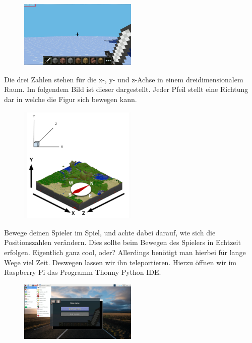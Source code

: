 \begin{figure}[H]
	\includegraphics[width=0.5\textwidth]{Bilder/Mincraft_position.png} %
\end{figure}

Die drei Zahlen stehen für die x-, y- und z-Achse in einem dreidimensionalem Raum. Im folgendem Bild ist dieser dargestellt. Jeder Pfeil stellt eine Richtung dar in welche die Figur sich bewegen kann.
\begin{figure}[H]
	\includegraphics[width=0.5\textwidth]{Bilder/dreidimensionalem_Raum.png} %
\end{figure}

Bewege deinen Spieler im Spiel, und achte dabei darauf, wie sich die Positionszahlen verändern. Dies sollte beim Bewegen des Spielers in Echtzeit 
erfolgen. Eigentlich ganz cool, oder? Allerdings benötigt man hierbei für 
lange Wege viel Zeit. Deswegen lassen wir ihn teleportieren. Hierzu öffnen wir im Raspberry Pi das Programm Thonny Python IDE.
\begin{figure}[H]
	\includegraphics[width=0.5\textwidth]{Bilder/Thonny_Python_IDE.png} %
\end{figure}

